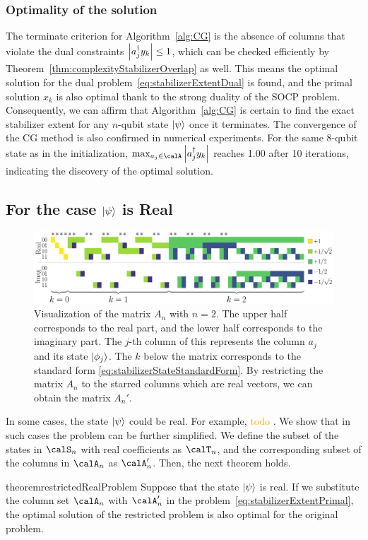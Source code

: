 \documentclass[a4paper, onecolumn, 11pt, longbibliography]{quantumarticle}
\newcommand{\orange}[1]{\textcolor{orange}{#1}}
\begin{document}
\subsubsection{Optimality of the solution}

The terminate criterion for Algorithm~\ref{alg:CG}
is the absence of columns that violate
the dual constraints $\abs{a_j^\dagger y_k} \leq 1$,
which can be checked efficiently
by Theorem~\ref{thm:complexityStabilizerOverlap} as well.
This means the optimal solution for the
dual problem~\eqref{eq:stabilizerExtentDual}
is found, and the primal solution $x_k$ is also optimal
thank to the strong duality of the SOCP problem.
Consequently, we can affirm that
Algorithm~\ref{alg:CG} is certain to
find the exact stabilizer extent
for any $n$-qubit state $\ket{\psi}$
once it terminates.
The convergence of the CG method
is also confirmed in numerical experiments.
For the same 8-qubit state as in the initialization,
$\max_{a_j \in \calA} \abs{a_j^\dagger y_k}$
reaches 1.00 after 10 iterations,
indicating the discovery of the optimal solution.

\subsection{For the case $\ket{\psi}$ is Real}
\label{sec:restrictedRealProblem}

\begin{figure}[htbp]
  \centering
  \includegraphics[width=\columnwidth]{imgs/Amat.pdf}
  \caption{
    Visualization of the matrix $A_n$ with $n=2$.
    The upper half corresponds to the real part,
    and the lower half corresponds to the imaginary part.
    The $j$-th column of this represents
    the column $a_j$ and its state $\ket{\phi_j}$.
    The $k$ below the matrix
    corresponds to
    the standard form \eqref{eq:stabilizerStateStandardForm}.
    By restricting the matrix $A_n$
    to the starred columns
    which are real vectors,
    we can obtain the matrix $A_n'$.
  }
  \label{fig:Amat}
\end{figure}

In some cases, the state $\ket{\psi}$ could be real.
For example, \orange{todo} .
We show that in such cases the problem can be further simplified.
We define the subset of the states in $\calS_n$ with real coefficients as $\calT_n$,
and the corresponding subset of the columns in $\calA_n$ as $\calA'_n$.
Then, the next theorem holds.
\begin{restatable}{theorem}{restrictedRealProblem}
  \label{thm:restrictedRealProblem}
  Suppose that the state $\ket{\psi}$ is real.
  If we substitute the column set $\calA_n$ with $\calA'_n$
  in the problem~\eqref{eq:stabilizerExtentPrimal},
  the optimal solution of the restricted problem
  is also optimal for the original problem.
\end{restatable}
\end{document}
